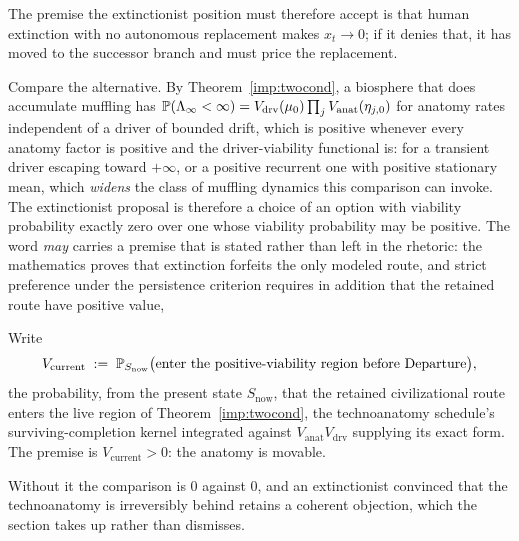 \begin{proposition}
\noindent The premise the extinctionist position must therefore
accept is that human extinction with no autonomous replacement makes
$x_t\to0$; if it denies that, it has moved to the successor branch and
must price the replacement.

Compare the alternative. By Theorem~\ref{imp:twocond}, a biosphere
that does accumulate muffling has
$\mathbb{P}(\Lambda_\infty<\infty)=V_{\mathrm{drv}}(\mu_0)\prod_jV_{\mathrm{anat}}(\eta_{j,0})$
for anatomy rates independent of a driver of bounded drift, which is
positive whenever every anatomy factor is positive and the driver-viability
functional is: for a transient driver escaping toward $+\infty$, or a
positive recurrent one with positive stationary mean, which
\emph{widens} the class of muffling dynamics this comparison can
invoke. The extinctionist proposal is therefore a choice of an option
with viability probability exactly zero over one whose viability
probability may be positive. The word \emph{may} carries a premise that
is stated rather than left in the rhetoric: the mathematics proves that
extinction forfeits the only modeled route, and strict preference under
the persistence criterion requires in addition that the retained route
have positive value,
\begin{premise}\label{hr:prem:option}
Write
\[
V_{\mathrm{current}}\;:=\;\mathbb{P}_{S_{\mathrm{now}}}\bigl(\text{enter the
positive-viability region before Departure}\bigr),
\]
the probability, from the present state $S_{\mathrm{now}}$, that the
retained civilizational route enters the live region of
Theorem~\ref{imp:twocond}, the technoanatomy schedule's
surviving-completion kernel integrated against
$V_{\mathrm{anat}}V_{\mathrm{drv}}$ supplying its exact form. The premise
is $V_{\mathrm{current}}>0$: the anatomy is movable.
\end{premise}
\noindent Without it the comparison is $0$ against $0$, and an
extinctionist convinced that the technoanatomy is irreversibly behind retains a
coherent objection, which the section takes up rather than dismisses.


\end{proposition}
